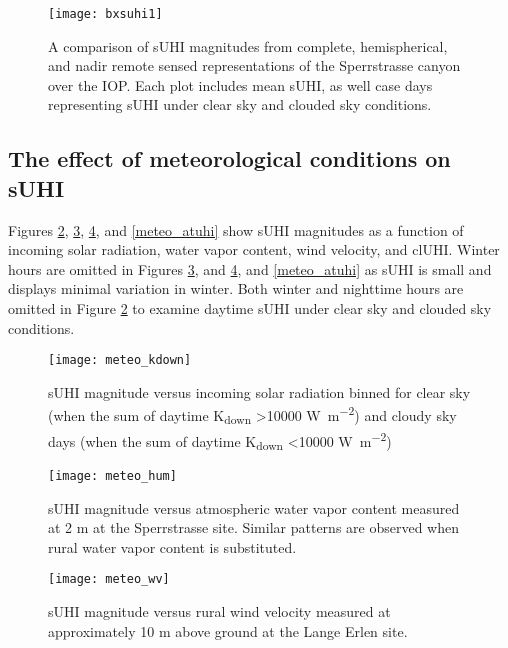 \begin{figure}[H]
	\centering
	\texttt{[image: bxsuhi1]}
	\caption{A comparison of sUHI magnitudes from complete, hemispherical, and nadir remote sensed representations of the Sperrstrasse canyon over the IOP. Each plot includes mean sUHI, as well case days representing sUHI under clear sky and clouded sky conditions.}
	\label{bx_suhi_compare}
\end{figure}

\subsection{The effect of meteorological conditions on sUHI}

Figures \ref{meteo_kdown}, \ref{meteo_hum}, \ref{meteo_wv}, and \ref{meteo_atuhi} show sUHI magnitudes as a function of incoming solar radiation, water vapor content, wind velocity, and clUHI. Winter hours are omitted in Figures \ref{meteo_hum}, and \ref{meteo_wv}, and \ref{meteo_atuhi} as sUHI is small and displays minimal variation in winter. Both winter and nighttime hours are omitted in Figure \ref{meteo_kdown} to examine daytime sUHI under clear sky and clouded sky conditions.

\begin{figure}[H]
	\centering
	\texttt{[image: meteo\_kdown]}
	\caption{sUHI magnitude versus incoming solar radiation binned for clear sky (when the sum of daytime K\textsubscript{down} \textgreater 10000 \si{\watt \per \square \meter}) and cloudy sky days (when the sum of daytime K\textsubscript{down} \textless 10000 \si{\watt \per \square \meter})}
	\label{meteo_kdown}
\end{figure}

\begin{figure}[H]
	\centering
	\texttt{[image: meteo\_hum]}
	\caption{sUHI magnitude versus atmospheric water vapor content measured at 2 \si{\meter} at the Sperrstrasse site. Similar patterns are observed when rural water vapor content is substituted.}
	\label{meteo_hum}
\end{figure}

\begin{figure}[H]
	\centering
	\texttt{[image: meteo\_wv]}
	\caption{sUHI magnitude versus rural wind velocity measured at approximately 10 \si{\meter} above ground at the Lange Erlen site.}
	\label{meteo_wv}
\end{figure}


